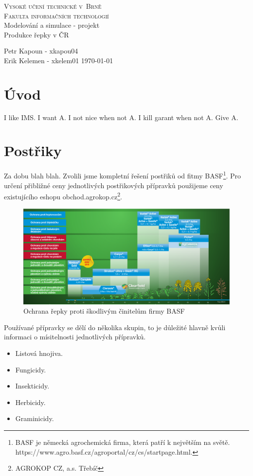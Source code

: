 \documentclass[11pt,a4paper,titlepage]{article}
\begin{document}
\begin{titlepage}
\begin{center}
    {\LARGE\textsc{Vysoké učení technické v~Brně}}\\
    \smallskip
    {\Large\textsc{Fakulta informačních technologií}}\\
    \bigskip
    \LARGE{Modelování a simulace - projekt}\\
    \smallskip
    \Huge{Produkce řepky v ČR}\\
\end{center}
    {\Large Petr Kapoun - xkapou04 \\ Erik Kelemen - xkelem01 \hfill \today }
\end{titlepage}

\tableofcontents
\newpage


\section{Úvod}
I like IMS. I want A. I not nice when not A. I kill garant when not A. Give A.


\section{Postřiky}
Za dobu blah blah. Zvolili jsme kompletní řešení postřiků od fitmy BASF\footnote{BASF je německá agrochemická firma, která patří k 
největším na světě.\\https://www.agro.basf.cz/agroportal/cz/cs/startpage.html.}.
Pro určení přibližné ceny jednotlivých postřikových přípravků použijeme ceny existujícího eshopu obchod.agrokop.cz\footnote{AGROKOP CZ, a.s. Třebíč}.
\begin{figure}[ht!]
\centering
\includegraphics[width=170mm]{img/basf_postriky.eps}
\caption{Ochrana řepky proti škodlivým činitelům firmy BASF \label{overflow}}
\end{figure}
Používané přípravky se dělí do několika skupin, to je důležité hlavně kvůli informaci o mísitelnosti jednotlivých přípravků.
\begin{itemize}
  \item Listová hnojiva.
  \item Fungicidy.
  \item Insekticidy.
  \item Herbicidy.
  \item Graminicidy.
\end{itemize}
\end{document}
